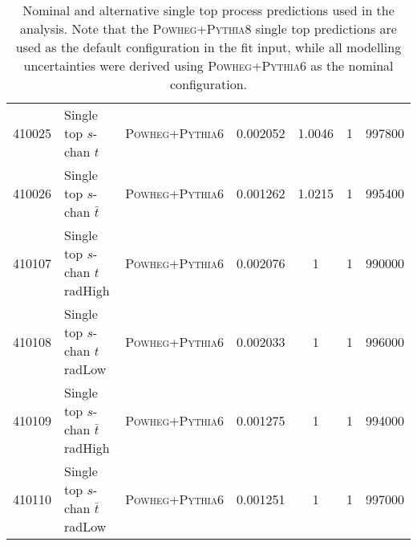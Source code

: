 \begin{table}[hb]
{\begin{tabular}{rllS[table-format=3.2]S[table-format=3.2]rr}
      410025 & Single top $s$-chan $t$ & \textsc{Powheg}+\textsc{Pythia}6 & 0.002052 & 1.0046 & 1 &  997800\\
      410026 & Single top $s$-chan $\bar{t}$ & \textsc{Powheg}+\textsc{Pythia}6 & 0.001262 & 1.0215 & 1 &  995400\\
      410107 & Single top $s$-chan $t$ radHigh  & \textsc{Powheg}+\textsc{Pythia}6 & 0.002076 & 1 & 1 & 990000\\
      410108 & Single top $s$-chan $t$ radLow  & \textsc{Powheg}+\textsc{Pythia}6 & 0.002033 & 1 & 1 & 996000\\
      410109 & Single top $s$-chan $\bar{t}$ radHigh & \textsc{Powheg}+\textsc{Pythia}6  & 0.001275 & 1 & 1 & 994000\\
      410110 & Single top $s$-chan $\bar{t}$ radLow  & \textsc{Powheg}+\textsc{Pythia}6 & 0.001251 & 1 & 1 & 997000\\
      \bottomrule
  \end{tabular}
  }
  \caption{Nominal and alternative single top process predictions used in the
    analysis. Note that the \textsc{Powheg}+\textsc{Pythia}8 single top
    predictions are used as the default configuration in the fit input, while
    all modelling uncertainties were derived using
    \textsc{Powheg}+\textsc{Pythia}6 as the nominal configuration.}
  \label{tab:st-nom-alt}
\end{table}